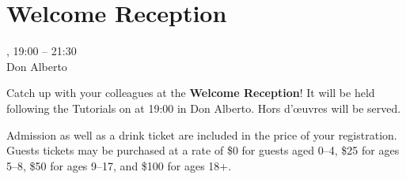 \clearpage
\section[Welcome Reception]{Welcome Reception}
\setheaders{}{\daydateyear}

\begin{center}
\daydateyear, 19:00 -- 21:30 \vspace{1em}\\
Don Alberto\\
\end{center}

\noindent Catch up with your colleagues at the \textbf{Welcome
Reception}! It will be held following the Tutorials
on \daydate at 19:00 in Don Alberto. Hors d'\oe{}uvres will be served.

Admission as well as a drink ticket are included in the price of your
registration. Guests tickets may be purchased at a rate of \$0 for guests
aged 0--4, \$25 for ages 5--8, \$50 for ages 9--17, and \$100 for ages 18+.
